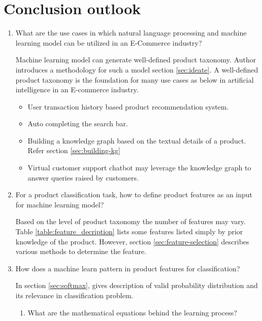 \chapter{Conclusion outlook}

\begin{enumerate}[label=\textbf{RQ\arabic*:}]
    \item What are the use cases in which natural language processing and machine learning model can be utilized in an E-Commerce industry?
    
    Machine learning model can generate well-defined product taxonomy. Author introduces a methodology for such a model section \ref{sec:ideate}. A well-defined product taxonomy is the foundation for many use cases as below in artificial intelligence in an E-commerce industry.
    \begin{itemize}
        \item User transaction history based product recommendation system. 
        \item Auto completing the search bar.
        \item Building a knowledge graph based on the textual details of a product. Refer section \ref{sec:building-kg}
        \item Virtual customer support chatbot may leverage the knowledge graph to answer queries raised by customers.
    \end{itemize}
    
    \item For a product classification task, how to define product features as an input for machine learning model?
    
   Based on the level of product taxonomy the number of features may vary. Table \ref{table:feature_decription} lists some features listed simply by prior knowledge of the product. However, section \ref{sec:feature-selection} describes various methods to determine the feature.

    
    \item How does a machine learn pattern in product features for classification?
    
    
    In section \ref{sec:softmax}, gives description of valid probability distribution and its relevance in classification problem.

    \begin{enumerate}[label=\textbf{SRQ\arabic*:}]
        \item What are the mathematical equations behind the learning process?
    

\end{enumerate}
\end{enumerate}
